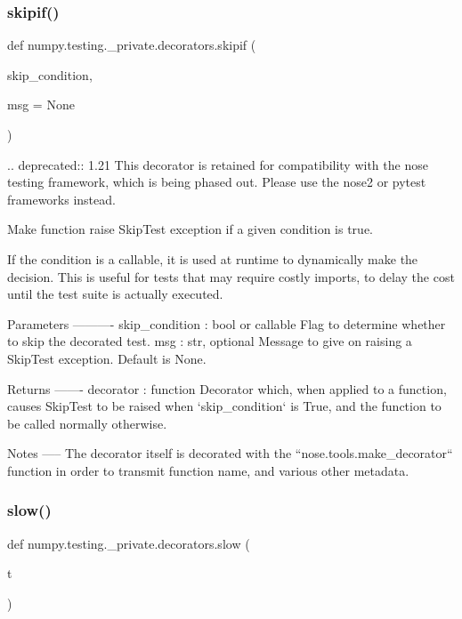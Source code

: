 \subsubsection{\texorpdfstring{skipif()}{skipif()}}
{\footnotesize\ttfamily def numpy.\+testing.\+\_\+private.\+decorators.\+skipif (\begin{DoxyParamCaption}\item[{}]{skip\+\_\+condition,  }\item[{}]{msg = {\ttfamily None} }\end{DoxyParamCaption})}

\begin{DoxyVerb}.. deprecated:: 1.21
    This decorator is retained for compatibility with the nose testing framework, which is being phased out.
    Please use the nose2 or pytest frameworks instead.

Make function raise SkipTest exception if a given condition is true.

If the condition is a callable, it is used at runtime to dynamically
make the decision. This is useful for tests that may require costly
imports, to delay the cost until the test suite is actually executed.

Parameters
----------
skip_condition : bool or callable
    Flag to determine whether to skip the decorated test.
msg : str, optional
    Message to give on raising a SkipTest exception. Default is None.

Returns
-------
decorator : function
    Decorator which, when applied to a function, causes SkipTest
    to be raised when `skip_condition` is True, and the function
    to be called normally otherwise.

Notes
-----
The decorator itself is decorated with the ``nose.tools.make_decorator``
function in order to transmit function name, and various other metadata.\end{DoxyVerb}
 \mbox{\label{namespacenumpy_1_1testing_1_1__private_1_1decorators_a6e89bc2d3f956de807a5413afee38bd5}} 
\subsubsection{\texorpdfstring{slow()}{slow()}}
{\footnotesize\ttfamily def numpy.\+testing.\+\_\+private.\+decorators.\+slow (\begin{DoxyParamCaption}\item[{}]{t }\end{DoxyParamCaption})}

